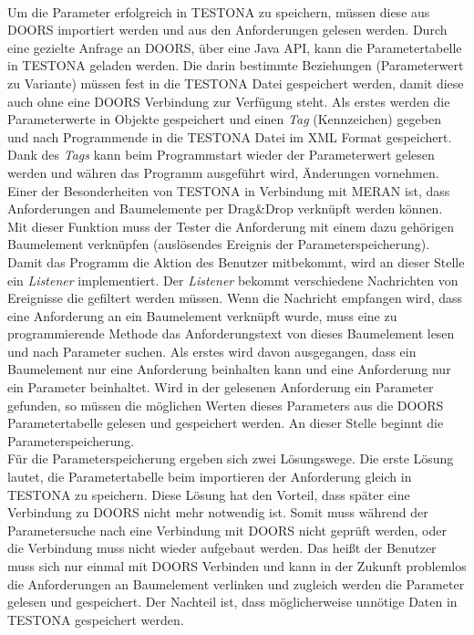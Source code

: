 \paragraph{}
 
Um die Parameter erfolgreich in TESTONA zu speichern, müssen diese aus DOORS importiert werden und aus den Anforderungen gelesen werden. Durch eine gezielte Anfrage an DOORS, über eine Java API, kann die Parametertabelle in TESTONA geladen werden. Die darin bestimmte Beziehungen (Parameterwert zu Variante) müssen fest in die TESTONA Datei gespeichert werden, damit diese auch ohne eine DOORS Verbindung zur Verfügung steht. Als erstes werden die Parameterwerte in Objekte gespeichert und einen \textit{Tag} (Kennzeichen) gegeben und nach Programmende in die TESTONA Datei im XML Format gespeichert. Dank des \textit{Tags} kann beim Programmstart wieder der Parameterwert gelesen werden und währen das Programm ausgeführt wird, Änderungen vornehmen.\\

Einer der Besonderheiten von TESTONA in Verbindung mit MERAN ist, dass Anforderungen and Baumelemente per Drag\&Drop verknüpft werden können. Mit dieser Funktion muss der Tester die Anforderung mit einem dazu gehörigen Baumelement verknüpfen (auslösendes Ereignis der Parameterspeicherung). Damit das Programm die Aktion des Benutzer mitbekommt, wird an dieser Stelle ein \textit{Listener} implementiert. Der \textit{Listener} bekommt verschiedene Nachrichten von Ereignisse die gefiltert werden müssen. Wenn die Nachricht empfangen wird, dass eine Anforderung an ein Baumelement verknüpft wurde, muss eine zu programmierende Methode das Anforderungstext von dieses Baumelement lesen und nach Parameter suchen. Als erstes wird davon ausgegangen, dass ein Baumelement nur eine Anforderung beinhalten kann und eine Anforderung nur ein Parameter beinhaltet. Wird in der gelesenen Anforderung ein Parameter gefunden, so müssen die möglichen Werten dieses Parameters aus die DOORS Parametertabelle gelesen und gespeichert werden. An dieser Stelle beginnt die Parameterspeicherung.\\

Für die Parameterspeicherung ergeben sich zwei Lösungswege. Die erste Lösung lautet, die Parametertabelle beim importieren der Anforderung gleich in TESTONA zu speichern. Diese Lösung hat den Vorteil, dass später eine Verbindung zu DOORS nicht mehr notwendig ist. Somit muss während der Parametersuche nach eine Verbindung mit DOORS nicht geprüft werden, oder die Verbindung muss nicht wieder aufgebaut werden. Das heißt der Benutzer muss sich nur einmal mit DOORS Verbinden und kann in der Zukunft problemlos die Anforderungen an Baumelement verlinken und zugleich werden die Parameter gelesen und gespeichert. Der Nachteil ist, dass möglicherweise unnötige Daten in TESTONA gespeichert werden.\\

